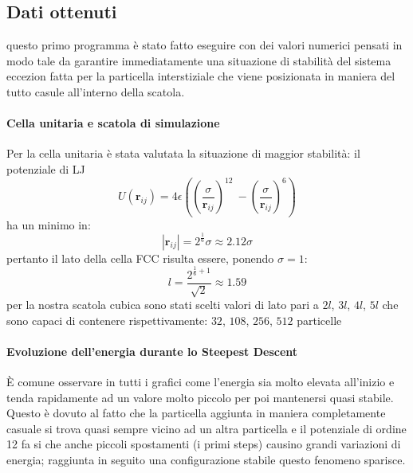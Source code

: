 \documentclass[a4paper,11pt]{article}
\begin{document}
	\subsection{Dati ottenuti} %
	\label{sub:dati_ottenuti}
		questo primo programma è stato fatto eseguire con dei valori numerici 
		pensati in modo tale da garantire immediatamente una situazione di stabilità
		del sistema eccezion fatta per la particella interstiziale che viene posizionata in maniera del tutto casule all'interno della scatola.
		\paragraph{Cella unitaria e scatola di simulazione\\} %
		\label{par:cella_unitaria_e_scatola_di_simulazione}
			Per la cella unitaria è stata valutata la situazione di maggior 
			stabilità: il potenziale di LJ
			\begin{equation}
				U(\mathbf{r}_{ij})= 4 \epsilon \left(\left(\frac{\sigma}{\mathbf{r}_{ij}}\right)^{12}\
				-\left(\frac{\sigma}{\mathbf{r}_{ij}}\right)^6\right)
			\end{equation}
			ha un minimo in:
			\begin{equation}
				\left|\mathbf{r}_{ij}\right| = 2^{\frac{1}{6}} \sigma
				\approx 2.12 \sigma
			\end{equation}
			pertanto il lato della cella FCC risulta essere, ponendo $\sigma = 1$:
			\begin{equation}
				l = \frac{2^{\frac{1}{6}+1}}{\sqrt{2}} \approx 1.59
			\end{equation}
			per la nostra scatola cubica sono stati scelti valori di lato pari a 
			$2l$, $3l$, $4l$, $5l$ che sono capaci di contenere rispettivamente: 
			$32$, $108$, $256$, $512$ particelle
		\paragraph{Evoluzione dell'energia durante lo Steepest Descent\\} %
		\label{par:evoluzione_dell_energia_durante_lo_steepest_descent}
			\`E comune osservare in tutti i grafici come l'energia sia molto
			elevata all'inizio e tenda rapidamente ad un valore molto piccolo per
			poi mantenersi quasi stabile.\\
			Questo è dovuto al fatto che la particella aggiunta in maniera 
			completamente casuale si trova quasi sempre vicino ad un altra 
			particella e il potenziale di ordine 12 fa si che anche piccoli
			spostamenti (i primi steps) causino grandi variazioni di energia;
			raggiunta in seguito una configurazione stabile questo 
			fenomeno sparisce.\\
			
\end{document}
